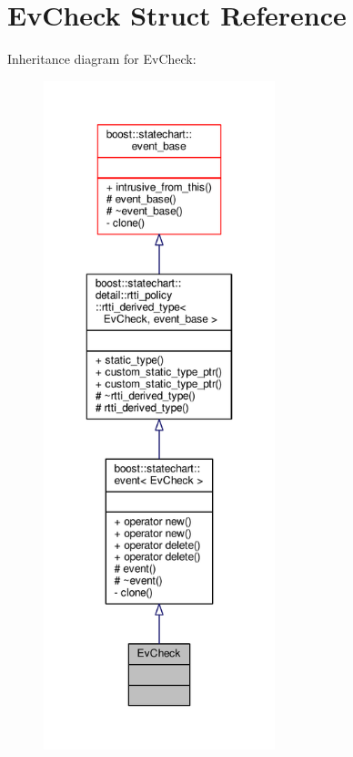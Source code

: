 \hypertarget{struct_ev_check}{}\section{Ev\+Check Struct Reference}
\label{struct_ev_check}


Inheritance diagram for Ev\+Check\+:
\nopagebreak
\begin{figure}[H]
\begin{center}
\leavevmode
\includegraphics[height=550pt]{struct_ev_check__inherit__graph}
\end{center}
\end{figure}


